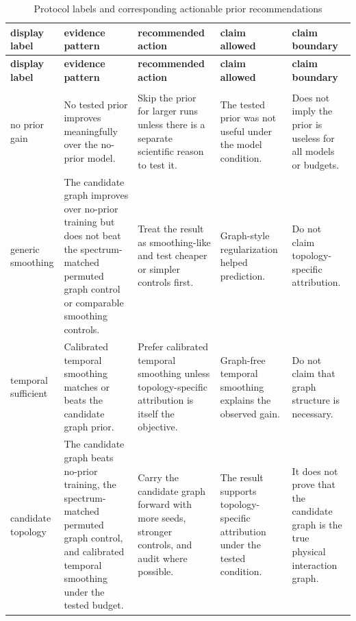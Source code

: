 \documentclass[preprint,12pt]{elsarticle}
\begin{document}
\begingroup
\scriptsize
\setlength{\tabcolsep}{3pt}
\renewcommand{\arraystretch}{1.08}
\begin{longtable}{>{\raggedright\arraybackslash}p{}>{\raggedright\arraybackslash}p{}>{\raggedright\arraybackslash}p{}>{\raggedright\arraybackslash}p{}>{\raggedright\arraybackslash}p{}}
\caption{Protocol labels and corresponding actionable prior recommendations}\label{tab:protocol-labels}\\
\toprule
\textbf{display label} & \textbf{evidence pattern} & \textbf{recommended action} & \textbf{claim allowed} & \textbf{claim boundary} \\
\midrule
\endfirsthead
\toprule
\textbf{display label} & \textbf{evidence pattern} & \textbf{recommended action} & \textbf{claim allowed} & \textbf{claim boundary} \\
\midrule
\endhead
\midrule
\multicolumn{5}{r}{\emph{Continued on next page}} \\
\midrule
\endfoot
\bottomrule
\endlastfoot
no prior gain & No tested prior improves meaningfully over the no-prior model. & Skip the prior for larger runs unless there is a separate scientific reason to test it. & The tested prior was not useful under the model condition. & Does not imply the prior is useless for all models or budgets. \\
generic smoothing & The candidate graph improves over no-prior training but does not beat the spectrum-matched permuted graph control or comparable smoothing controls. & Treat the result as smoothing-like and test cheaper or simpler controls first. & Graph-style regularization helped prediction. & Do not claim topology-specific attribution. \\
temporal sufficient & Calibrated temporal smoothing matches or beats the candidate graph prior. & Prefer calibrated temporal smoothing unless topology-specific attribution is itself the objective. & Graph-free temporal smoothing explains the observed gain. & Do not claim that graph structure is necessary. \\
candidate topology & The candidate graph beats no-prior training, the spectrum-matched permuted graph control, and calibrated temporal smoothing under the tested budget. & Carry the candidate graph forward with more seeds, stronger controls, and audit where possible. & The result supports topology-specific attribution under the tested condition. & It does not prove that the candidate graph is the true physical interaction graph. \\

\end{longtable}
\end{document}
